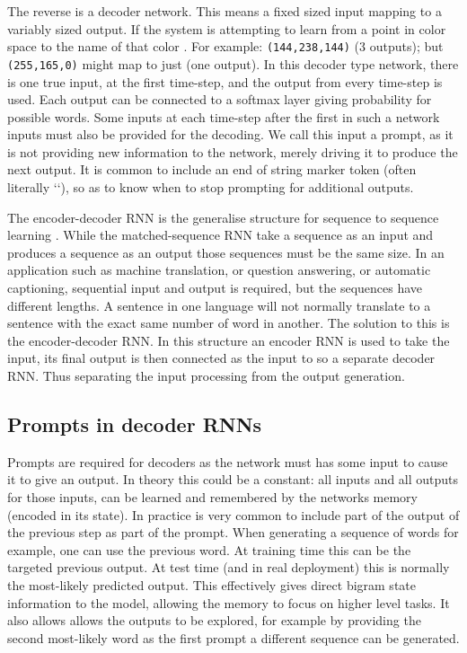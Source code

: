 \documentclass[12pt,parskip]{komatufte}
\begin{document}
The reverse is a decoder network.
This means a fixed sized input mapping to a variably sized output.
If the system is attempting to learn from a point in color space to the name of that color .
For example: \texttt{(144,238,144)}  (3 outputs); but \texttt{(255,165,0)} might map to just  (one output).
In this decoder type network, there is one true input, at the first time-step, and the output from every time-step is used.
Each output can be connected to a softmax layer giving probability for possible words.
Some inputs at each time-step after the first in such a network inputs must also be provided for the decoding.
We call this input a prompt, as it is not providing new information to the network, merely driving it to produce the next output.
It is common to include an end of string marker token (often literally ``),
so as to know when to stop prompting for additional outputs.


The encoder-decoder RNN is the generalise structure for sequence to sequence learning .
While the matched-sequence RNN take a sequence as an input and produces a sequence as an output those sequences must be the same size.
In an application such as machine translation, or question answering, or automatic captioning, sequential input and output is required, but the sequences have different lengths.
A sentence in one language will not normally translate to a sentence with the exact same number of word in another.
The solution to this is the encoder-decoder RNN.
In this structure an encoder RNN is used to take the input, its final output is then connected as the input to so a separate decoder RNN.
Thus separating the input processing from the output generation.


\subsection{Prompts in decoder RNNs}


Prompts are required for decoders as the network must has some input to cause it to give an output.
In theory this could be a constant: all inputs and all outputs for those inputs, can be learned and remembered by the networks memory (encoded in its state).
In practice is very common to include part of the output of the previous step as part of the prompt.
When generating a sequence of words for example, one can use the previous word.
At training time this can be the targeted previous output.
At test time (and in real deployment) this is normally the most-likely predicted output.
This effectively gives direct bigram state information to the model,
allowing the memory to focus on higher level tasks.
It also allows allows the outputs to be explored, for example by providing the second most-likely word as the first prompt a different sequence can be generated.
\end{document}
